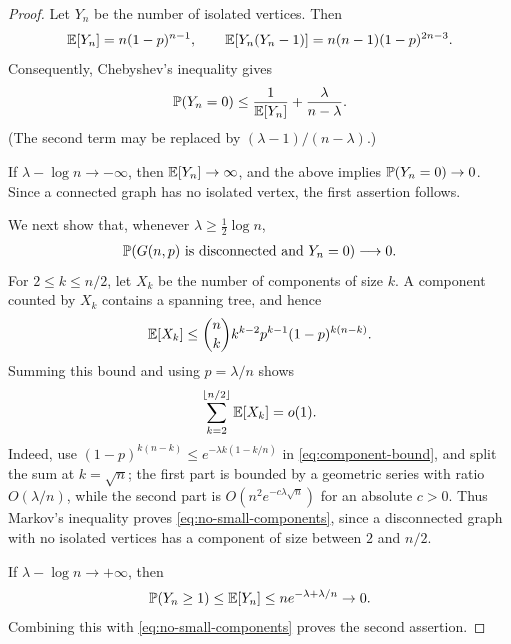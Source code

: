\begin{proof}
    Let $Y_n$ be the number of isolated vertices. Then
    \begin{align}
        \mathbb{E}[Y_n]=n(1-p)^{n-1},
        \qquad
        \mathbb{E}[Y_n(Y_n-1)]=n(n-1)(1-p)^{2n-3}.
    \end{align}
    Consequently, Chebyshev's inequality gives
    \begin{align}
        \mathbb{P}(Y_n=0)\leq \frac{1}{\mathbb{E}[Y_n]}+\frac{\lambda}{n-\lambda}.
    \end{align}
    (The second term may be replaced by $(\lambda-1)/(n-\lambda)$.)

    If $\lambda-\log n\to-\infty$, then $\mathbb{E}[Y_n]\to\infty$, and
    the above implies $\mathbb{P}(Y_n=0)\to0$. Since a connected
    graph has no isolated vertex, the first assertion follows.

    We next show that, whenever $\lambda\geq \frac12\log n$,
    \begin{align}
        \mathbb{P}(G(n,p)\text{ is disconnected and }Y_n=0)\longrightarrow0.
        \label{eq:no-small-components}
    \end{align}
    For $2\leq k\leq n/2$, let $X_k$ be the number of components of size $k$.
    A component counted by $X_k$ contains a spanning tree, and hence
    \begin{align}
        \mathbb{E}[X_k]
        \leq \binom{n}{k}k^{k-2}p^{k-1}(1-p)^{k(n-k)}.
        \label{eq:component-bound}
    \end{align}
    Summing this bound and using $p=\lambda/n$ shows
    \begin{align}
        \sum_{k=2}^{\lfloor n/2\rfloor}\mathbb{E}[X_k]=o(1).
        \label{eq:component-sum}
    \end{align}
    Indeed, use $(1-p)^{k(n-k)}\leq e^{-\lambda k(1-k/n)}$ in
    \eqref{eq:component-bound}, and split the sum at $k=\sqrt n$; the first
    part is bounded by a geometric series with ratio $O(\lambda/n)$, while
    the second part is $O(n^2e^{-c\lambda\sqrt n})$ for an absolute $c>0$.
    Thus Markov's inequality proves \eqref{eq:no-small-components}, since a
    disconnected graph with no isolated vertices has a component of size
    between $2$ and $n/2$.

    If $\lambda-\log n\to+\infty$, then
    \begin{align}
        \mathbb{P}(Y_n\geq1)\leq \mathbb{E}[Y_n]\leq ne^{-\lambda+\lambda/n}\to0.
    \end{align}
    Combining this with \eqref{eq:no-small-components} proves the second
    assertion.


\end{proof}
